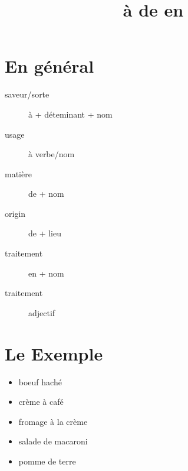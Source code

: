 \documentclass{article}
\begin{document}
\title{à de en}
\date{}


\section{En général}


\begin{description}
\item[saveur/sorte] à + déteminant + nom
\item[usage] à verbe/nom
\item[matière] de + nom
\item[origin] de + lieu
\item[traitement] en + nom
\item[traitement] adjectif
\end{description}


\section{Le Exemple}


\begin{itemize}
\item boeuf haché
\item crème à café
\item fromage à la crème
\item salade de macaroni
\item pomme de terre
\end{itemize}
\end{document}
